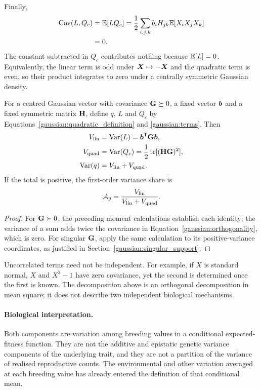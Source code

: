 Finally,
\begin{align}
\operatorname{Cov}(L,Q_c)
 &=\mathbb E[LQ_c]
   =\frac12\sum_{i,j,k}b_iH_{jk}\mathbb E[X_iX_jX_k]\nonumber\\
 &=0.
\label{gaussian:orthogonality}
\end{align}
The constant subtracted in $Q_c$ contributes nothing because $\mathbb E[L]=0$.
Equivalently, the linear term is odd under $\boldsymbol{X}\mapsto-\boldsymbol{X}$ and
the quadratic term is even, so their product integrates to zero under a
centrally symmetric Gaussian density.

\begin{proposition}
\label{gaussian:variance_partition}
For a centred Gaussian vector with covariance $\mathbf{G}\succeq0$, a fixed
vector $\boldsymbol{b}$ and a fixed symmetric matrix $\mathbf{H}$, define $q$, $L$
and $Q_c$ by Equations~\eqref{gaussian:quadratic_definition} and
\eqref{gaussian:terms}. Then
\begin{align}
V_{\mathrm{lin}}&=\operatorname{Var}(L)=\boldsymbol{b}^{\mathsf T}\mathbf{G}\boldsymbol{b},\nonumber\\
V_{\mathrm{quad}}&=\operatorname{Var}(Q_c)=\frac12\operatorname{tr}[(\mathbf{H}\mathbf{G})^2],\nonumber\\
\operatorname{Var}(q)&=V_{\mathrm{lin}}+V_{\mathrm{quad}}.
\label{gaussian:variance_formulas}
\end{align}
If the total is positive, the first-order variance share is
\begin{equation}
\mathcal A_g=\frac{V_{\mathrm{lin}}}{V_{\mathrm{lin}}+V_{\mathrm{quad}}}.
\label{gaussian:share}
\end{equation}
\end{proposition}
\begin{proof}
For $\mathbf{G}\succ0$, the preceding moment calculations establish each
identity; the variance of a sum adds twice the covariance in
Equation~\eqref{gaussian:orthogonality}, which is zero. For singular
$\mathbf{G}$, apply the same calculation to its positive-variance coordinates,
as justified in Section~\ref{gaussian:singular_support}.
\end{proof}

Uncorrelated terms need not be independent. For example, if $X$ is standard
normal, $X$ and $X^2-1$ have zero covariance, yet the second is determined
once the first is known. The decomposition above is an orthogonal
decomposition in mean square; it does not describe two independent
biological mechanisms.

\paragraph{Biological interpretation.}
Both components are variation among breeding values in a conditional
expected-fitness function. They are not the additive and epistatic genetic
variance components of the underlying trait, and they are not a partition
of the variance of realised reproductive counts. The environmental and
other variation averaged at each breeding value has already entered the
definition of that conditional mean.

